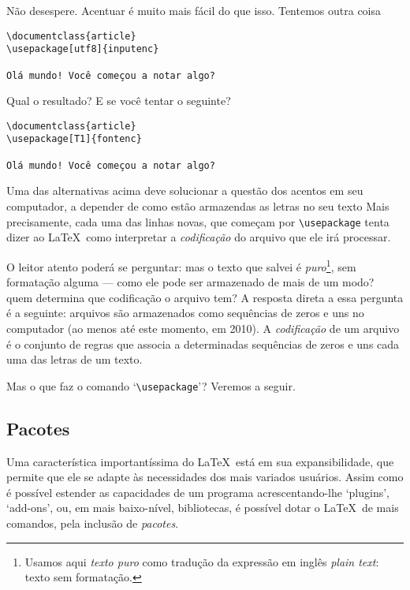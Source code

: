Não desespere. Acentuar é muito mais fácil do que isso. Tentemos outra
coisa
\begin{footnotesize}
\begin{verbatim}
\documentclass{article}
\usepackage[utf8]{inputenc}

Olá mundo! Você começou a notar algo?

\end{verbatim}
\end{footnotesize}

Qual o resultado? E se você tentar o seguinte?
\begin{footnotesize}
\begin{verbatim}
\documentclass{article}
\usepackage[T1]{fontenc}

Olá mundo! Você começou a notar algo?

\end{verbatim}
\end{footnotesize}

Uma das alternativas acima deve solucionar a questão dos acentos em
seu computador, a depender de como estão armazendas as letras no
seu texto Mais precisamente, cada uma das linhas novas, que começam
por \verb'\usepackage' tenta dizer ao \LaTeX\ como interpretar a
\emph{codificação} do arquivo que ele irá processar.

\begin{detalhe}
O leitor atento poderá se perguntar: mas o texto que salvei é
\emph{puro}\footnote{Usamos aqui \emph{texto puro} como tradução da
  expressão em inglês \emph{plain text}: texto sem formatação.}, sem
formatação alguma --- como ele pode ser armazenado de mais de um modo?
quem determina que codificação o arquivo tem? 
A resposta direta a essa pergunta é a seguinte: arquivos são
armazenados como sequências de zeros e uns no computador (ao menos até
este momento, em 2010). A \emph{codificação} de um arquivo é o
conjunto de regras que associa a determinadas sequências de zeros e
uns cada uma das letras de um texto.
\end{detalhe}

Mas o que faz o comando `\verb'\usepackage''? Veremos a seguir.

\subsection{Pacotes}

Uma característica importantíssima do \LaTeX\ está em sua
expansibilidade, que permite que ele se adapte às necessidades
dos mais variados usuários. Assim como é possível estender as
capacidades de um programa acrescentando-lhe `plugins', `add-ons', ou,
em mais baixo-nível, bibliotecas, é possível dotar o \LaTeX\ de mais
comandos, pela inclusão de \emph{pacotes}.

